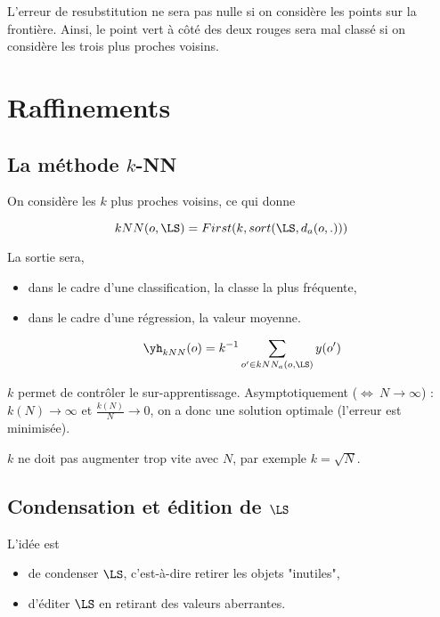 	
	L'erreur de resubstitution ne sera pas nulle si on considère les points sur la frontière. Ainsi, le point vert à côté des deux rouges sera mal classé si on considère les trois plus proches voisins.
	
	\section{Raffinements}
	
		\subsection{La méthode $k$-NN}
		
		On considère les $k$ plus proches voisins, ce qui donne
		
		$$kNN(o, \LS) = First(k, sort(\LS, d_a(o, .)))$$
		
		La sortie sera,
		
		\begin{itemize}
			\item dans le cadre d'une classification, la classe la plus fréquente,
			\item dans le cadre d'une régression, la valeur moyenne.
			
			$$\yh_{kNN}(o) = k^{-1} \sum_{o' \in kNN_a(o, \LS)} y(o')$$
		\end{itemize}
		
		$k$ permet de contrôler le sur-apprentissage. Asymptotiquement ($\Leftrightarrow \: N \rightarrow \infty$) : $k(N) \rightarrow \infty$ et $\frac{k(N)}{N} \rightarrow 0$, on a donc une solution optimale (l'erreur est minimisée).
		
		
		$k$ ne doit pas augmenter trop vite avec $N$, par exemple $k = \sqrt{N}$.
		
		\subsection{Condensation et édition de $\LS$}
		
		L'idée est
		
		\begin{itemize}
			\item de condenser $\LS$, c'est-à-dire retirer les objets "inutiles",
			\item d'éditer $\LS$ en retirant des valeurs aberrantes.
		\end{itemize}
		
